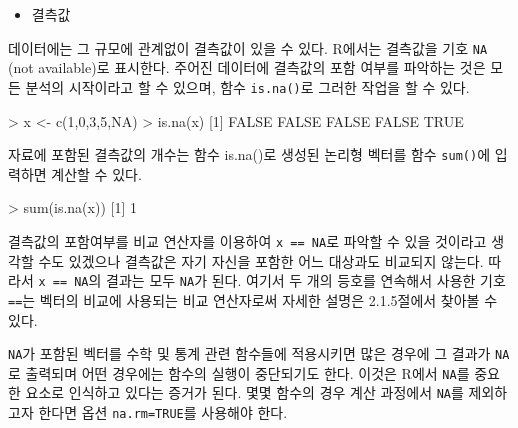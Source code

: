 \documentclass[
]{book}
\newenvironment{Shaded}{\begin{snugshade}}{\end{snugshade}}
\newcommand{\ConstantTok}[1]{\textcolor[rgb]{0.00,0.00,0.00}{#1}}
\newcommand{\DecValTok}[1]{\textcolor[rgb]{0.00,0.00,0.81}{#1}}
\newcommand{\FunctionTok}[1]{\textcolor[rgb]{0.00,0.00,0.00}{#1}}
\newcommand{\NormalTok}[1]{#1}
\newcommand{\OtherTok}[1]{\textcolor[rgb]{0.56,0.35,0.01}{#1}}
\newcommand{\SpecialCharTok}[1]{\textcolor[rgb]{0.00,0.00,0.00}{#1}}
\providecommand{\tightlist}{%
  \setlength{\itemsep}{0pt}\setlength{\parskip}{0pt}}
\begin{document}
\begin{itemize}
\tightlist
\item
  결측값
\end{itemize}

데이터에는 그 규모에 관계없이 결측값이 있을 수 있다. R에서는 결측값을 기호 \texttt{NA} (not
available)로 표시한다. 주어진 데이터에 결측값의 포함 여부를 파악하는 것은 모든 분석의
시작이라고 할 수 있으며, 함수 \texttt{is.na()}로 그러한 작업을 할 수 있다.

\begin{Shaded}
\begin{Highlighting}[]
\SpecialCharTok{\textgreater{}}\NormalTok{ x }\OtherTok{\textless{}{-}} \FunctionTok{c}\NormalTok{(}\DecValTok{1}\NormalTok{,}\DecValTok{0}\NormalTok{,}\DecValTok{3}\NormalTok{,}\DecValTok{5}\NormalTok{,}\ConstantTok{NA}\NormalTok{)}
\SpecialCharTok{\textgreater{}} \FunctionTok{is.na}\NormalTok{(x)}
\NormalTok{[}\DecValTok{1}\NormalTok{] }\ConstantTok{FALSE} \ConstantTok{FALSE} \ConstantTok{FALSE} \ConstantTok{FALSE}  \ConstantTok{TRUE}
\end{Highlighting}
\end{Shaded}

자료에 포함된 결측값의 개수는 함수 is.na()로 생성된 논리형 벡터를 함수 \texttt{sum()}에 입
력하면 계산할 수 있다.

\begin{Shaded}
\begin{Highlighting}[]
\SpecialCharTok{\textgreater{}} \FunctionTok{sum}\NormalTok{(}\FunctionTok{is.na}\NormalTok{(x))}
\NormalTok{[}\DecValTok{1}\NormalTok{] }\DecValTok{1}
\end{Highlighting}
\end{Shaded}

결측값의 포함여부를 비교 연산자를 이용하여 \texttt{x\ ==\ NA}로 파악할 수 있을 것이라고 생각할
수도 있겠으나 결측값은 자기 자신을 포함한 어느 대상과도 비교되지 않는다.
따라서 \texttt{x\ ==\ NA}의 결과는 모두 \texttt{NA}가 된다.
여기서 두 개의 등호를 연속해서 사용한 기호 \texttt{==}는 벡터의 비교에 사용되는 비교 연산자로써 자세한 설명은 2.1.5절에서 찾아볼 수 있다.

\texttt{NA}가 포함된 벡터를 수학 및 통계 관련 함수들에 적용시키면 많은 경우에 그 결과가 \texttt{NA}
로 출력되며 어떤 경우에는 함수의 실행이 중단되기도 한다. 이것은 R에서 \texttt{NA}를 중요한
요소로 인식하고 있다는 증거가 된다. 몇몇 함수의 경우 계산 과정에서 \texttt{NA}를 제외하고자
한다면 옵션 \texttt{na.rm=TRUE}를 사용해야 한다.
\end{document}
